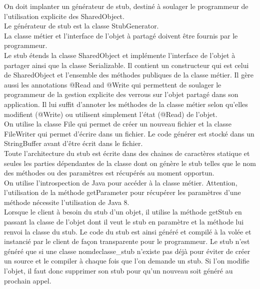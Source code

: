 \documentclass[a4paper,12pt]{article}
\begin{document}
\bigskip
\bigskip

On doit  implanter un générateur de stub, destiné à soulager le programmeur de l'utilisation explicite des SharedObject. \\

Le générateur de stub est la classe StubGenerator.\\
La classe métier et l'interface de l'objet à partagé doivent être fournis par le programmeur.\\

Le stub étends la classe SharedObject et implémente l'interface de l'objet à partager ainsi que la classe Serializable.
Il contient un constructeur qui est celui de SharedObject et l'ensemble des méthodes publiques de la classe métier.
Il gère aussi les annotations @Read and @Write qui permettent de soulager le programmeur de la gestion explicite des verrous sur l'objet partagé dans son application. Il lui suffit d'annoter les méthodes de la classe métier selon qu'elles modifient (@Write) ou utilisent simplement l'état (@Read) de l'objet. \\

On utilise la classe File qui permet de créer un nouveau fichier et la classe FileWriter qui permet d'écrire dans un fichier. Le code générer est stocké dans un StringBuffer avant d'être écrit dans le fichier.\\
Toute l'architecture du stub est écrite dans des chaines de caractères statique et seules les parties dépendantes de la classe dont on génère le stub telles que le nom des méthodes ou des paramètres est récupérés au moment opportun.\\
 On utilise l'introspection de Java pour accéder à la classe métier. Attention, l'utilisation de la méthode getParameter pour récupérer les paramètres d'une méthode nécessite l'utilisation de Java 8.\\

Lorsque le client à besoin du stub d'un objet, il utilise la méthode getStub en passant la classe de l'objet dont il veut le stub en paramètre et la méthode lui renvoi la classe du stub. Le code du stub est ainsi généré et compilé à la volée et instancié par le client de façon transparente pour le programmeur. Le stub n'est généré que si une classe nomdeclasse\_stub n'existe pas déjà pour éviter de créer un source et le compiler à chaque fois que l'on demande un stub. Si l'on modifie l'objet, il faut donc supprimer son stub pour qu'un nouveau soit généré au prochain appel.\\
\end{document}

